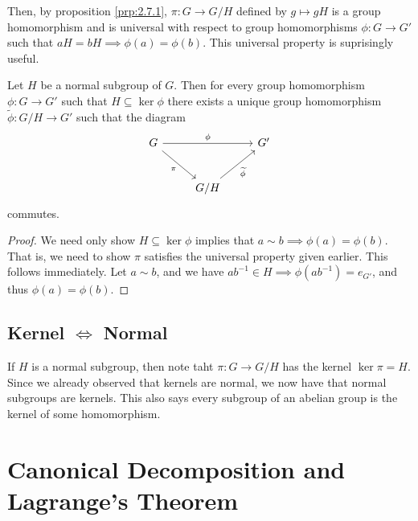 Then, by proposition \ref{prp:2.7.1}, $\pi : G \to G /H$ defined by $g\mapsto gH$ is a group homomorphism and is universal with respect to group homomorphisms $\phi : G \to G'$ such that $aH=bH\implies \phi (a)=\phi (b)$. This universal property is suprisingly useful.
\begin{theorem}\label{thm:2.7.1}
	Let $H$ be a normal subgroup of $G$. Then for every group homomorphism $\phi : G \to G'$ such that $H\subseteq \ker \phi $ there exists a unique group homomorphism $\widetilde{\phi} : G /H \to G'$ such that the diagram
	\[\begin{tikzcd}[row sep=2.5em, column sep=2.5em]
		G\arrow[rr, "\phi "]\arrow[dr, "\pi"']&&G'\\
						     &G /H\arrow[ur, "\widetilde{\phi}"']
	\end{tikzcd}\]
	commutes.
\end{theorem}
\begin{proof}
	We need only show $H\subseteq  \ker \phi $ implies that $a\sim b \implies \phi (a)=\phi (b)$. That is, we need to show $\pi $ satisfies the universal property given earlier. This follows immediately. Let $a\sim b$, and we have $ab^{-1}\in H \implies \phi (ab^{-1})=e_{G'}$, and thus $\phi (a)=\phi (b)$.
\end{proof}
\subsection{Kernel $\iff$ Normal}
If $H$ is a normal subgroup, then note taht $\pi : G \to G /H$ has the kernel $\ker \pi =H$. Since we already observed that kernels are normal, we now have that normal subgroups are kernels. This also says every subgroup of an abelian group is the kernel of some homomorphism.

\section{Canonical Decomposition and Lagrange's Theorem}
